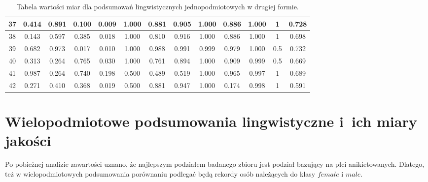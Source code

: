 \documentclass{classrep}
\begin{document}
\begin{center}
\begin{table}[H]
\begin{adjustbox}{center=11cm}
\begin{tabularx}{\textwidth}{ccccccccccccc}
37	&	0.414	&	0.891	&	0.100	&	0.009	&	1.000	&	0.881	&	0.905	&	1.000	&	0.886	&	1.000	&	1	&	0.728	\\ \hline
38	&	0.143	&	0.597	&	0.385	&	0.018	&	1.000	&	0.810	&	0.916	&	1.000	&	0.886	&	1.000	&	1	&	0.698	\\ \hline
39	&	0.682	&	0.973	&	0.017	&	0.010	&	1.000	&	0.988	&	0.991	&	0.999	&	0.979	&	1.000	&	0.5	&	0.732	\\ \hline
40	&	0.313	&	0.264	&	0.765	&	0.030	&	1.000	&	0.761	&	0.894	&	1.000	&	0.909	&	0.999	&	0.5	&	0.669	\\ \hline
41	&	0.987	&	0.264	&	0.740	&	0.198	&	0.500	&	0.489	&	0.519	&	1.000	&	0.965	&	0.997	&	1	&	0.689	\\ \hline
42	&	0.271	&	0.410	&	0.368	&	0.019	&	0.500	&	0.881	&	0.947	&	1.000	&	0.174	&	0.998	&	1	&	0.591	\\ \hline
  \end{tabularx}
  \end{adjustbox}
  \caption{Tabela wartości miar dla podsumowań lingwistycznych jednopodmiotowych w drugiej formie.}
\end{table}
\end{center}
 
% 
% 
\section{Wielopodmiotowe podsumowania lingwistyczne i~ich miary jakości} 

Po pobieżnej analizie zawartości uznano, że najlepszym podziałem badanego zbioru \cite{database} jest podział bazujący na płci 
anikietowanych. Dlatego, też w wielopodmiotowych podsumowania porównaniu podlegać będą rekordy osób należących do klasy \(female\) i \(male\).
\end{document}
